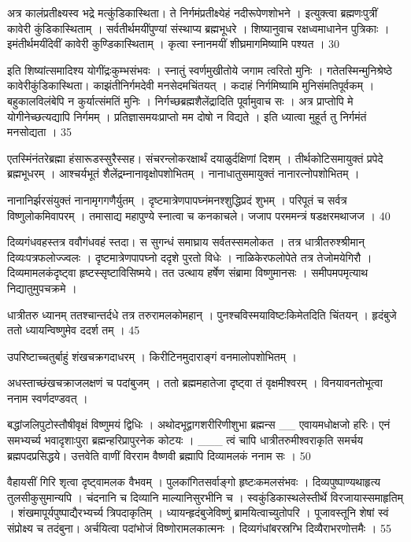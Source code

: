 अत्र कालंप्रतीक्ष्यस्व भद्रे मत्कुंडिकास्थिता।
ते निर्गमंप्रतीक्ष्येहं नदीरूपेणशोभने ।
इत्युक्त्वा ब्रह्मणःपुत्रीं कावेरी कुंडिकास्थिताम् ।
सर्वतीर्थमयींपुण्यां संस्थाप्य ब्रह्मभूधरे ।
शिष्यानुवाच रक्षध्वमाधानेन पुत्रिकाः ।
इमंतीर्थमयींदेवीं कावेरी कुण्डिकास्थिताम् ।
कृत्वा स्नानमयीं शीघ्रमागमिष्यामि पश्यत ।
30

इति शिष्यांत्समादिश्य योगींद्रःकुम्भसंभवः ।
स्नातुं स्वर्णमुखीतोये जगाम त्वरितो मुनिः ।
गतेतस्मिन्मुनिश्रेष्ठे कावेरीकुंडिकास्थिता।
काझंतीनिर्गमदेवी मनसेदमचिंतयत् ।
कदाहं निर्गमिष्यामि मुनिसंमतिपूर्वकम् ।
बहुकालविलंबेपि न कुर्यात्संमतिं मुनिः ।
निर्गच्छब्रह्मशैलेंद्रादिति पूर्वामुवाच सः ।
अत्र प्राप्तोपि मे योगीनेच्छत्यद्यापि निर्गमम् ।
प्रतिज्ञासमयःप्राप्तो मम दोषो न विद्यते ।
इति ध्यात्वा मुहूर्त तु निर्गमंतं मनसोद्यता ।
35

एतस्मिंनंतरेब्रह्मा हंसारूडस्सुरैस्सह।
संचरन्लोकरक्षार्थं दयाळुर्दक्षिणां दिशम् ।
तीर्थकोटिसमायुक्तं प्रपेदे ब्रह्मभूधरम् ।
आश्चर्यभूतं शैलेंद्रम्नानावृक्षोपशोभितम् ।
नानाधातुसमायुक्तं नानारत्नोपशोभितम् ।

नानानिर्झरसंयुक्तं नानामृगगणैर्युतम् ।
दृष्टमात्रेणपापघ्नंमनश्शुद्धिप्रदं शुभम् ।
परिपूतं च सर्वत्र विष्णुलोकमिवापरम् ।
तमासाद्य महापुण्ये स्नात्वा च कनकाचले।
जजाप परममन्त्रं षडक्षरमथाजज ।
40

दिव्यगंधवहस्तत्र ववौगंधवहं स्तदा।
स सुगन्धं समाघ्राय सर्वतस्समलोकत ।
तत्र धात्रीतरुश्श्रीमान् दिव्यःपत्रफलोज्ज्वलः ।
दृष्टमात्रेणपापघ्नो ददृशे पुरतो विधेः ।
नाळिकेरफलोपेते तत्र तेजोमयेगिरौ ।
दिव्यमामलकंदृष्ट्वा हृष्टस्सृष्टाविसिष्मये।
तत उत्थाय हर्षेण संब्रामा विष्णुमानसः ।
समीपमपमृत्याथ निद्यातुमुपचक्रमे ।

धात्रीतरु ध्यानम् ततश्चान्तर्दधे तत्र तरुरामलकोमहान् ।
पुनश्चविस्मयाविष्टःकिमेतदिति चिंतयन् ।
हृदंबुजे ततो ध्यायन्विष्णुमेव ददर्श तम् ।
45

उपरिष्टाच्चतुर्बाहुं शंखचक्रगदाधरम् ।
किरीटिनमुदाराङ्गं वनमालोपशोभितम् ।

अधस्ताच्छंखचक्राजलक्षणं च पदांबुजम् ।
ततो ब्रह्ममहातेजा दृष्ट्वा तं वृक्षमीश्वरम् ।
विनयावनतोभूत्वा ननाम स्वर्णदण्डवत् ।

बद्धांजलिपुटोस्तौषीवृक्षं विष्णुमयं द्विधिः ।
अथोदभूद्वागशरीरिणीशुभा ब्रह्मन्स
__ एवायमधोक्षजो हरिः।
एनं समभ्यर्च्य भवादृशाःपुरा
ब्रह्मन्हरिप्रापुरनेक कोटयः ।
___ त्वं चापि धात्रीतरुमीश्वराकृति
समर्चय ब्रह्मपदप्रसिद्धये।
उत्तवेति वाणीं विरराम वैष्णवी ब्रह्मापि
दिव्यामलकं ननाम सः ।
50

वैहायसीं गिरि शृत्वा दृष्ट्वामलक वैभवम् ।
पुलकांगितसर्वाङ्गो हृष्टःकमलसंभवः ।
दिव्यपुष्पाण्यथाहृत्य तुलसीकुसुमान्यपि ।
चंदनानि च दिव्यानि माल्यानिसुरभीनि च ।
स्वकुंडिकास्थलेस्तीर्थे विरजायास्समाहृतिम् ।
शंखमापूर्यपुष्पाद्यैरभ्यर्च्य त्रिपदाकृतिम् ।
ध्यायन्हृदंबुजेविष्णुं ब्रामयित्वाच्युतोपरि ।
पूजावस्तूनि शेषां स्वं संप्रोक्ष्य च तदंबुना।
अर्चयित्वा पदांभोजं विष्णोरामलकात्मनः ।
दिव्यगंधांबरस्रग्भि दिव्यैराभरणोत्तमैः ।
55

